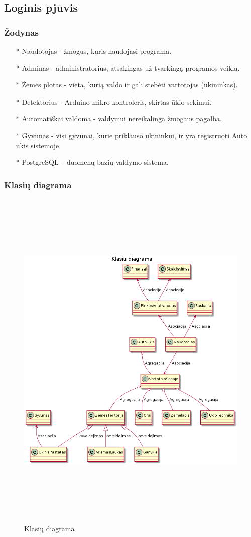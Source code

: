 \documentclass[oneside]{VUMIFPSkursinis}
\begin{document}
\subsection{Loginis pjūvis}
\subsubsection{Žodynas}
\begin{itemize}
			\item[*] Naudotojas - žmogus, kuris naudojasi programa.
			\item[*] Adminas - administratorius, atsakingas už tvarkingą programos veiklą.
			\item[*] Žemės plotas - vieta, kurią valdo ir gali stebėti vartotojas (ūkininkas). 
			\item[*] Detektorius - Arduino mikro kontroleris, skirtas ūkio sekimui.
			\item[*] Automatiškai valdoma - valdymui nereikalinga žmogaus pagalba.
			\item[*] Gyvūnas - visi gyvūnai, kurie priklauso ūkininkui, ir yra registruoti Auto ūkis sistemoje.
			\item[*] PostgreSQL – duomenų bazių valdymo sistema.
\end{itemize}

\pagebreak

\subsubsection{Klasių diagrama}
			\begin{figure}[H]
		\centering	
\includegraphics[width=18cm,height=17cm,keepaspectratio]{Klasesv2.png}
	\caption{Klasių diagrama}
	\label{fig:Klasesv2}
\end{figure}
	
\end{document}
